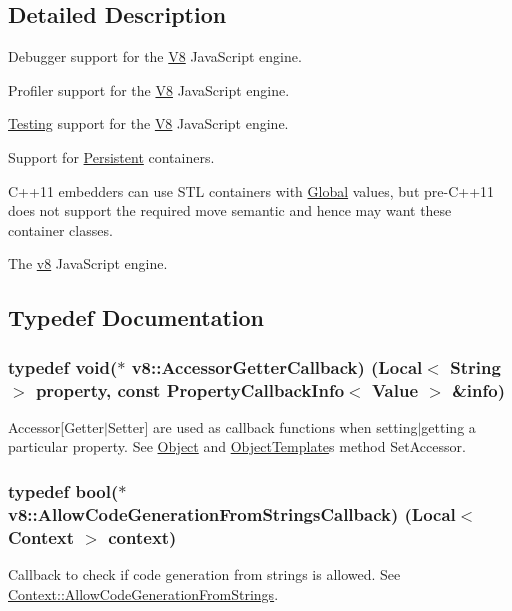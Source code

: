 \subsection{Detailed Description}
Debugger support for the \hyperlink{classv8_1_1_v8}{V8} Java\+Script engine.

Profiler support for the \hyperlink{classv8_1_1_v8}{V8} Java\+Script engine.

\hyperlink{classv8_1_1_testing}{Testing} support for the \hyperlink{classv8_1_1_v8}{V8} Java\+Script engine.

Support for \hyperlink{classv8_1_1_persistent}{Persistent} containers.

C++11 embedders can use S\+T\+L containers with \hyperlink{classv8_1_1_global}{Global} values, but pre-\/\+C++11 does not support the required move semantic and hence may want these container classes.

The \hyperlink{namespacev8}{v8} Java\+Script engine. 

\subsection{Typedef Documentation}
\hypertarget{namespacev8_a722613c87061708a4f1aa050d095f868}{}
\subsubsection[{Accessor\+Getter\+Callback}]{\setlength{\rightskip}{0pt plus 5cm}typedef void($\ast$ v8\+::\+Accessor\+Getter\+Callback) ({\bf Local}$<$ {\bf String} $>$ property, const {\bf Property\+Callback\+Info}$<$ {\bf Value} $>$ \&info)}\label{namespacev8_a722613c87061708a4f1aa050d095f868}
Accessor\mbox{[}Getter$\vert$\+Setter\mbox{]} are used as callback functions when setting$\vert$getting a particular property. See \hyperlink{classv8_1_1_object}{Object} and \hyperlink{classv8_1_1_object_template}{Object\+Template}\textquotesingle{}s method Set\+Accessor. \hypertarget{namespacev8_a521d909ec201742a1cb35d50a8e2a3c2}{}
\subsubsection[{Allow\+Code\+Generation\+From\+Strings\+Callback}]{\setlength{\rightskip}{0pt plus 5cm}typedef bool($\ast$ v8\+::\+Allow\+Code\+Generation\+From\+Strings\+Callback) ({\bf Local}$<$ {\bf Context} $>$ context)}\label{namespacev8_a521d909ec201742a1cb35d50a8e2a3c2}
Callback to check if code generation from strings is allowed. See \hyperlink{classv8_1_1_context_a794ccc42113566f5d363f89c8b0d3c2c}{Context\+::\+Allow\+Code\+Generation\+From\+Strings}. \hypertarget{namespacev8_ab699f4bbbb56350e6e915682e420fcdc}{}
